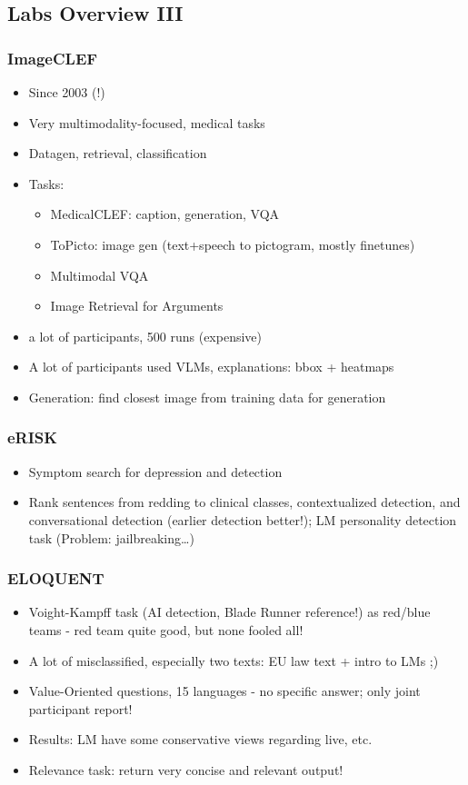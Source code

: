 \documentclass[a4paper]{article}
\begin{document}
\subsection{Labs Overview III}
\subsubsection{ImageCLEF}
\begin{itemize}
    \item Since 2003 (!)
    \item Very multimodality-focused, medical tasks
    \item Datagen, retrieval, classification
    \item Tasks:
          \begin{itemize}
              \item MedicalCLEF: caption, generation, VQA
              \item ToPicto: image gen (text+speech to pictogram, mostly finetunes)
              \item Multimodal VQA
              \item Image Retrieval for Arguments
          \end{itemize}
    \item a lot of participants, 500 runs (expensive)
    \item A lot of participants used VLMs, explanations: bbox + heatmaps
    \item Generation: find closest image from training data for generation
\end{itemize}
\subsubsection{eRISK}
\begin{itemize}
    \item Symptom search for depression and detection
    \item Rank sentences from redding to clinical classes, contextualized detection, and conversational detection (earlier detection better!); LM personality detection task (Problem: jailbreaking\dots)
\end{itemize}
\subsubsection{ELOQUENT}
\begin{itemize}
    \item Voight-Kampff task (AI detection, Blade Runner reference!) as red/blue teams - red team quite good, but none fooled all!
    \item A lot of misclassified, especially two texts: EU law text + intro to LMs ;)
    \item Value-Oriented questions, 15 languages - no specific answer; only joint participant report!
    \item Results: LM have some conservative views regarding live, etc.
    \item Relevance task: return very concise and relevant output!
\end{itemize}
\end{document}
